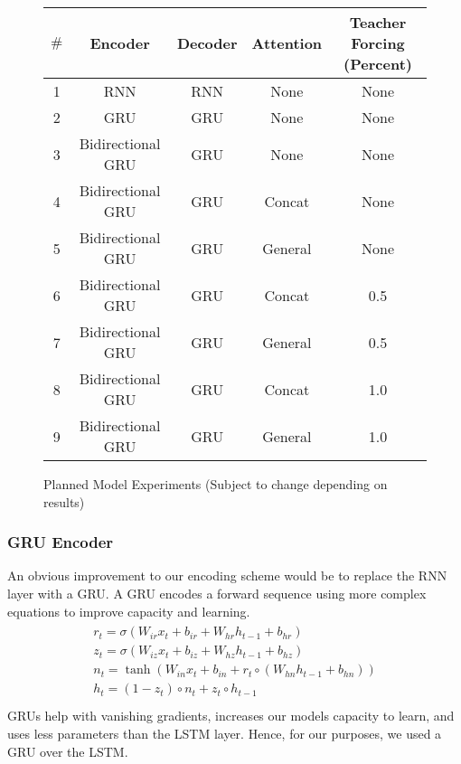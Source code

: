 \documentclass[twoside,twocolumn]{article}
\begin{document}
\begin{figure*}[ht]
    \centering
    \begin{tabular}{ |c|c|c|c|c| }
        \hline
        $\#$
          & \textbf{Encoder}
          & \textbf{Decoder}
          & \textbf{Attention}
          & \textbf{Teacher Forcing (Percent)} \\
        \hline
        1 & RNN & RNN & None & None \\ \hline
        2 & GRU & GRU & None & None \\ \hline
        3 & Bidirectional GRU & GRU & None & None \\ \hline
        4 & Bidirectional GRU & GRU & Concat & None \\ \hline
        5 & Bidirectional GRU & GRU & General & None \\ \hline
        6 & Bidirectional GRU & GRU & Concat & 0.5 \\ \hline
        7 & Bidirectional GRU & GRU & General & 0.5 \\ \hline
        8 & Bidirectional GRU & GRU & Concat & 1.0 \\ \hline
        9 & Bidirectional GRU & GRU & General & 1.0 \\ \hline
    \end{tabular}

    \caption{Planned Model Experiments (Subject to change depending on results)}
    \label{fig:model-experiments}
\end{figure*}

\subsubsection{GRU Encoder}
An obvious improvement to our encoding scheme would be to replace the RNN layer
with a GRU. A GRU encodes a forward sequence using more complex equations to
improve capacity and learning.
\begin{equation}
  \label{eq:gru}
  \begin{split}\begin{array}{ll}
    r_t = \sigma(W_{ir} x_t + b_{ir} + W_{hr} h_{t-1} + b_{hr}) \\
    z_t = \sigma(W_{iz} x_t + b_{iz} + W_{hz} h_{t-1} + b_{hz}) \\
    n_t = \tanh(W_{in} x_t + b_{in} + r_t \circ (W_{hn} h_{t-1}+ b_{hn})) \\
    h_t = (1 - z_t) \circ n_t + z_t \circ h_{t-1} \\
  \end{array}\end{split}
\end{equation}
GRUs help with vanishing gradients, increases our models capacity to learn,
and uses less parameters than the LSTM layer. Hence, for our purposes, we
used a GRU over the LSTM.
\end{document}
